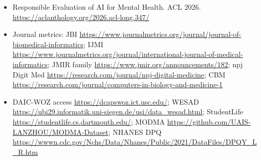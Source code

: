 \documentclass[11pt,a4paper]{article}
\begin{document}
\begin{footnotesize}
\begin{itemize}
\item Responsible Evaluation of AI for Mental Health. ACL 2026. \url{https://aclanthology.org/2026.acl-long.347/}
\item Journal metrics: JBI \url{https://www.journalmetrics.org/journal/journal-of-biomedical-informatics}; IJMI \url{https://www.journalmetrics.org/journal/international-journal-of-medical-informatics}; JMIR family \url{https://www.jmir.org/announcements/182}; npj Digit Med \url{https://research.com/journal/npj-digital-medicine}; CBM \url{https://research.com/journal/computers-in-biology-and-medicine-1}
\item DAIC-WOZ access \url{https://dcapswoz.ict.usc.edu/}; WESAD \url{https://ubi29.informatik.uni-siegen.de/usi/data_wesad.html}; StudentLife \url{https://studentlife.cs.dartmouth.edu/}; MODMA \url{https://github.com/UAIS-LANZHOU/MODMA-Dataset}; NHANES DPQ \url{https://wwwn.cdc.gov/Nchs/Data/Nhanes/Public/2021/DataFiles/DPQY_L_R.htm}
\end{itemize}
\end{footnotesize}
\end{document}
